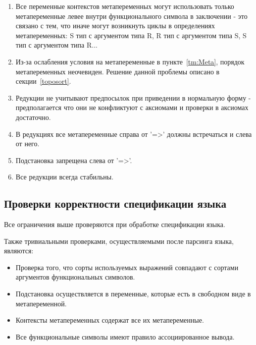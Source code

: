 \begin{enumerate}
\item Все переменные контекстов метапеременных могут использовать только метапеременные левее внутри функционального символа в заключении - это связано с тем, что иначе могут возникнуть циклы в определениях метапеременных: S тип с аргументом типа R, R тип с аргументом типа S, S тип с аргументом типа R...

\item Из-за ослабления условия на метапеременные в пункте~\ref{tm:Meta}, порядок метапеременных неочевиден. Решение данной проблемы описано в секции~\ref{toposort}.

\item Редукции не учитывают предпосылок при приведении в нормальную форму - предполагается что они не конфликтуют с аксиомами и проверки в аксиомах достаточно.

\item В редукциях все метапеременные справа от '=>' должны встречаться и слева от него.

\item Подстановка запрещена слева от '=>'.

\item Все редукции всегда стабильны.

\end{enumerate}

\subsection{Проверки корректности спецификации языка}

Все ограничения выше проверяются при обработке спецификации языка.

Также тривиальными проверками, осуществляемыми после парсинга языка, являются:
\begin{itemize}
\item Проверка того, что сорты используемых выражений совпадают с сортами аргументов функциональных символов.
\item Подстановка осуществляется в переменные, которые есть в свободном виде в метапеременной.
\item Контексты метапеременных содержат все их метапеременные.
\item Все функциональные символы имеют правило ассоциированное вывода.
\end{itemize}
